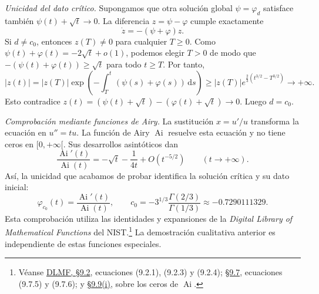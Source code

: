 \begin{sol}
\begin{enumerate}[label = (\alph*)]
\begin{itemize}
        \emph{Unicidad del dato crítico.}
        Supongamos que otra solución global $\psi=\varphi_d$ satisface también $\psi(t)+\sqrt t\to0$. La diferencia $z=\psi-\varphi$ cumple exactamente
        \[
            \dot z=-(\psi+\varphi)z.
        \]
        Si $d\neq c_0$, entonces $z(T)\neq0$ para cualquier $T\geq0$. Como $\psi(t)+\varphi(t)=-2\sqrt t+o(1)$, podemos elegir $T>0$ de modo que $-(\psi(t)+\varphi(t))\geq\sqrt t$ para todo $t\geq T$. Por tanto,
        \[
            |z(t)|=|z(T)|\exp\left(-\int_T^t(\psi(s)+\varphi(s))\,\mathrm{d}s\right)
            \geq |z(T)|e^{\frac23(t^{3/2}-T^{3/2})}
            \longrightarrow+\infty.
        \]
        Esto contradice $z(t)=(\psi(t)+\sqrt t)-(\varphi(t)+\sqrt t)\to0$. Luego $d=c_0$.
    \end{itemize}
\end{enumerate}

\emph{Comprobación mediante funciones de Airy.}
La sustitución $x=u'/u$ transforma la ecuación en $u''=tu$. La función de Airy $\operatorname{Ai}$ resuelve esta ecuación y no tiene ceros en $[0,+\infty[$. Sus desarrollos asintóticos dan
\[
    \frac{\operatorname{Ai}'(t)}{\operatorname{Ai}(t)}
    =-\sqrt t-\frac{1}{4t}+O(t^{-5/2})
    \qquad(t\to+\infty).
\]
Así, la unicidad que acabamos de probar identifica la solución crítica y su dato inicial:
\[
    \varphi_{c_0}(t)=\frac{\operatorname{Ai}'(t)}{\operatorname{Ai}(t)},\qquad
    c_0=-3^{1/3}\frac{\Gamma(2/3)}{\Gamma(1/3)}
    \approx-0.7290111329.
\]
Esta comprobación utiliza las identidades y expansiones de la \emph{Digital Library of Mathematical Functions} del NIST.\footnote{Véanse \href{https://dlmf.nist.gov/9.2}{DLMF, \S9.2}, ecuaciones (9.2.1), (9.2.3) y (9.2.4); \href{https://dlmf.nist.gov/9.7}{\S9.7}, ecuaciones (9.7.5) y (9.7.6); y \href{https://dlmf.nist.gov/9.9}{\S9.9(i)}, sobre los ceros de $\operatorname{Ai}$.} La demostración cualitativa anterior es independiente de estas funciones especiales.
\end{sol}
